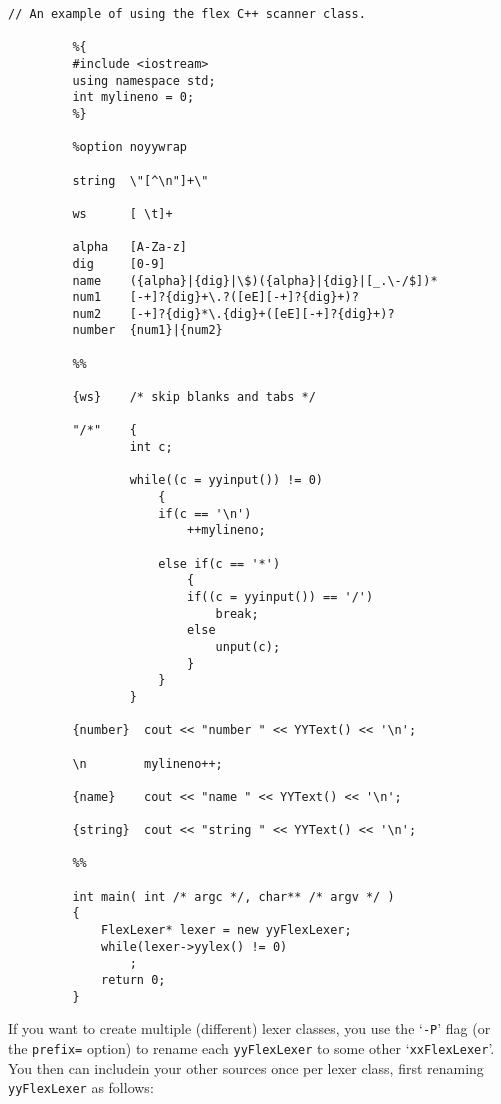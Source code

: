 \documentclass[openany,oneside]{book}
\begin{document}
\begin{verbatim}
// An example of using the flex C++ scanner class.
     
         %{
         #include <iostream>
         using namespace std;
         int mylineno = 0;
         %}
     
         %option noyywrap
     
         string  \"[^\n"]+\"
     
         ws      [ \t]+
     
         alpha   [A-Za-z]
         dig     [0-9]
         name    ({alpha}|{dig}|\$)({alpha}|{dig}|[_.\-/$])*
         num1    [-+]?{dig}+\.?([eE][-+]?{dig}+)?
         num2    [-+]?{dig}*\.{dig}+([eE][-+]?{dig}+)?
         number  {num1}|{num2}
     
         %%
     
         {ws}    /* skip blanks and tabs */
     
         "/*"    {
                 int c;
     
                 while((c = yyinput()) != 0)
                     {
                     if(c == '\n')
                         ++mylineno;
     
                     else if(c == '*')
                         {
                         if((c = yyinput()) == '/')
                             break;
                         else
                             unput(c);
                         }
                     }
                 }
     
         {number}  cout << "number " << YYText() << '\n';
     
         \n        mylineno++;
     
         {name}    cout << "name " << YYText() << '\n';
     
         {string}  cout << "string " << YYText() << '\n';
     
         %%
     
         int main( int /* argc */, char** /* argv */ )
         {
             FlexLexer* lexer = new yyFlexLexer;
             while(lexer->yylex() != 0)
                 ;
             return 0;
         }
\end{verbatim}


If you want to create multiple (different) lexer classes, you use the
‘\verb`-P`’ flag (or the \verb`prefix=` option) to rename each \verb`yyFlexLexer` to some other ‘\verb`xxFlexLexer`’.  You then can
includein your other sources once per lexer class,
first renaming \verb`yyFlexLexer` as follows:
\end{document}
